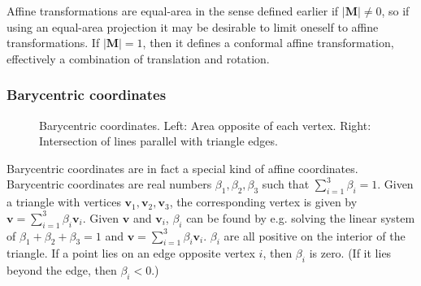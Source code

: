 \documentclass{amsart}[12pt]
\begin{document}
Affine transformations are equal-area in the sense defined earlier if
$|\mathbf M| \ne 0$, so if using an equal-area projection it may be desirable
to limit oneself to affine transformations. If $|\mathbf M| = 1$, then it defines a conformal affine transformation, effectively a combination of translation and rotation.

\subsubsection{Barycentric coordinates}
\begin{figure}%
\caption{Barycentric coordinates. Left: Area opposite of each vertex.
Right: Intersection of lines parallel with triangle edges.}
\label{fig:bary}
\end{figure}
Barycentric coordinates are in fact a special kind of affine coordinates.
Barycentric coordinates are real numbers $\beta_1, \beta_2, \beta_3$ such that
$\sum^3_{i=1} \beta_i = 1$. Given a triangle with vertices $\mathbf v_1,
\mathbf v_2, \mathbf v_3$, the corresponding vertex is given by $\mathbf v =
\sum^3_{i=1} \beta_i \mathbf v_i$. Given $\mathbf v$ and $\mathbf v_i$,
$\beta_i$ can be found by e.g. solving the linear system of
$\beta_1 + \beta_2 + \beta_3 = 1$ and $\mathbf v = \sum^3_{i=1} \beta_i \mathbf
v_i$. $\beta_i$ are all positive on the interior of the triangle. If a point
lies on an edge opposite vertex $i$, then $\beta_i$ is zero.
(If it lies beyond the edge, then $\beta_i < 0$.)
\end{document}
